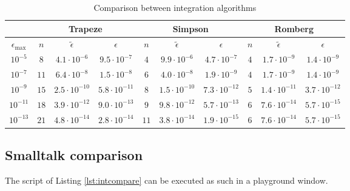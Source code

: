 \begin{table}[h]
  \centering
  \caption{Comparison between integration algorithms}\label{tb:intcompar}
\vspace{1 ex}
{\footnotesize\setlength{\tabcolsep}{2pt}%
\begin{tabular}{|c|c|c|c|c|c|c|c|c|c|} \hline
  & \multicolumn{3}{c|}{\textbf{Trapeze}} & \multicolumn{3}{c|}{\textbf{Simpson}} & \multicolumn{3}{c|}{\textbf{Romberg}} \\ \hline
  $\epsilon_{\max}$ & $n$ & $\tilde{\epsilon}$ & $\epsilon$ & $n$ & $\tilde{\epsilon}$ & $\epsilon$ & $n$ & $\tilde{\epsilon}$ & $\epsilon$ \\ \hline
  $10^{-5}$ & $8$ & $4.1\cdot 10^{-6}$ & $9.5\cdot 10^{-7}$ & $4$ & $9.9\cdot 10^{-6}$ & $4.7\cdot 10^{-7}$ & $4$ & $1.7\cdot 10^{-9}$ & $1.4\cdot 10^{-9}$ \\ \hline
  $10^{-7}$ & $11$ & $6.4\cdot 10^{-8}$ & $1.5\cdot 10^{-8}$ & $6$ & $4.0\cdot 10^{-8}$ & $1.9\cdot 10^{-9}$ & $4$ & $1.7\cdot 10^{-9}$ & $1.4\cdot 10^{-9}$ \\ \hline
  $10^{-9}$ & $15$ & $2.5\cdot 10^{-10}$ & $5.8\cdot 10^{-11}$ & $8$ & $1.5\cdot 10^{-10}$ & $7.3\cdot 10^{-12}$ & $5$ & $1.4\cdot 10^{-11}$ & $3.7\cdot 10^{-12}$ \\ \hline
  $10^{-11}$ & $18$ & $3.9\cdot 10^{-12}$ & $9.0\cdot 10^{-13}$ & $9$ & $9.8\cdot 10^{-12}$ & $5.7\cdot 10^{-13}$ & $6$ & $7.6\cdot 10^{-14}$ & $5.7\cdot 10^{-15}$ \\ \hline
  $10^{-13}$ & $21$ & $4.8\cdot 10^{-14}$ & $2.8\cdot 10^{-14}$ & $11$ & $3.8\cdot 10^{-14}$ & $1.9\cdot 10^{-15}$ & $6$ & $7.6\cdot 10^{-14}$ & $5.7\cdot 10^{-15}$ \\ \hline
\end{tabular}}
\end{table}

\subsection{Smalltalk comparison}
\label{sec:sintcompar} The script of Listing \ref{lst:intcompare}
can be executed as such in a playground window.

